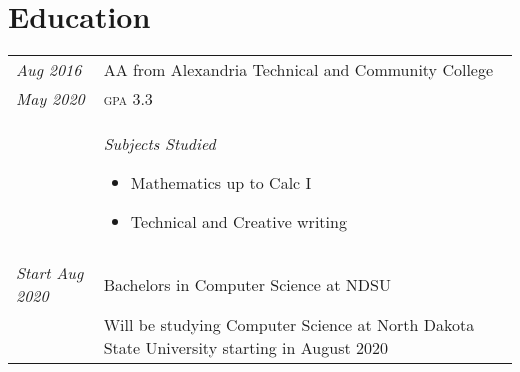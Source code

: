 \documentclass[letterpaper,10pt]{article}
\begin{document}
\section*{Education}
	\begin{tabular}{R{2cm}|p{14cm}}
	\textsl{Aug 2016} & AA from Alexandria Technical and Community College\\
	\textsl{May 2020} & \textsc{gpa} 3.3\\
	&\textsl{Subjects Studied}
	\begin{itemize}[noitemsep]
		\item Mathematics up to Calc I
		\item Technical and Creative writing
	\end{itemize}\\
	\\
	\textsl{Start Aug 2020} & Bachelors in Computer Science at NDSU\\
	& Will be studying Computer Science at North Dakota State University starting in August 2020
	\end{tabular}
{\let\thefootnote\relax{}} 
\end{document}
